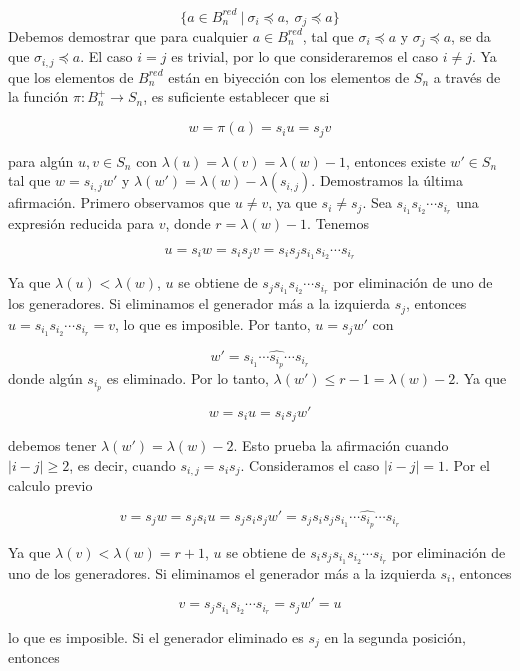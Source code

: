 \documentclass[12pt]{article}
\theoremstyle{definition}
\begin{document}
$$\{a\in B_n^{red}\ |\ \sigma_i\preceq a,\ \sigma_j\preceq a\}$$
\newline
Debemos demostrar que para cualquier $a\in B_n^{red}$, tal que $\sigma_i\preceq a$ y $\sigma_j\preceq a$, se da que $\sigma_{i,j}\preceq a$. El caso $i=j$ es trivial, por lo que consideraremos el caso $i\neq j$. Ya que los elementos de $B_n^{red}$ están en biyección con los elementos de $S_n$ a través de la función $\pi: B_n^+\rightarrow S_n$, es suficiente establecer que si

$$w=\pi(a)=s_iu=s_jv$$

para algún $u,v\in S_n$ con $\lambda(u)=\lambda(v)=\lambda(w)-1$, entonces existe $w'\in S_n$ tal que $w=s_{i,j}w'$ y $\lambda(w')=\lambda(w)-\lambda(s_{i,j})$.
\newline
\newline
Demostramos la última afirmación. Primero observamos que $u\neq v$, ya que $s_i\neq s_j$. Sea $s_{i_1}s_{i_2}\cdots s_{i_r}$ una expresión reducida para $v$, donde $r=\lambda(w)-1$. Tenemos

$$u=s_iw=s_is_jv=s_is_js_{i_1}s_{i_2}\cdots s_{i_r}$$

Ya que $\lambda(u)<\lambda(w)$, $u$ se obtiene de $s_js_{i_1}s_{i_2}\cdots s_{i_r}$ por eliminación de uno de los generadores. Si eliminamos el generador más a la izquierda $s_j$, entonces $u=s_{i_1}s_{i_2}\cdots s_{i_r}=v$, lo que es imposible. Por tanto, $u=s_jw'$ con

$$w'=s_{i_1}\cdots\widehat{s_{i_p}}\cdots s_{i_r}$$
\newline
donde algún $s_{i_p}$ es eliminado. Por lo tanto, $\lambda(w')\leq r-1=\lambda(w)-2$. Ya que

$$w=s_iu=s_is_jw'$$

debemos tener $\lambda(w')=\lambda(w)-2$. Esto prueba la afirmación cuando $|i-j|\geq 2$, es decir, cuando $s_{i,j}=s_is_j$.
\newline
\newline
Consideramos el caso $|i-j|=1$. Por el calculo previo

$$v=s_jw=s_js_iu=s_js_is_jw'=s_js_is_js_{i_1}\cdots\widehat{s_{i_p}}\cdots s_{i_r}$$

Ya que $\lambda(v)<\lambda(w)=r+1$, $u$ se obtiene de $s_is_js_{i_1}s_{i_2}\cdots s_{i_r}$ por eliminación de uno de los generadores. Si eliminamos el generador más a la izquierda $s_i$, entonces

$$v=s_js_{i_1}s_{i_2}\cdots s_{i_r}=s_jw'=u$$

lo que es imposible. Si el generador eliminado es $s_j$ en la segunda posición, entonces
\end{document}
